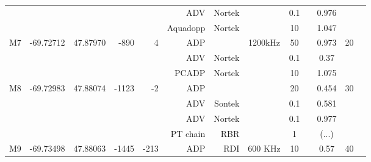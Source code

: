 \documentclass[letterpaper,10pt,landscape]{article}
\begin{document}
\begin{table}
\begin{tabular}{|r|c|c|r|r|r|r|c|c|c|c|c|c|}
    ~                   &                            &                           &                        &                       & ADV          & Nortek   &          & 0.1       &          & 0.976      &                     \\ %
    ~                   &                            &                           &                        &                       & Aquadopp     & Nortek   &          & 10        &          & 1.047      &                     \\\hline
    \multirow{3}{*}{M7} & \multirow{3}{*}{-69.72712} & \multirow{3}{*}{47.87970} & \multirow{3}{*}{-890}  & \multirow{3}{*}{4}    & ADP          &          & 1200kHz  & 50        &          & 0.973      & \multirow{3}{*}{20} \\ 
    ~                   &                            &                           &                        &                       & ADV          & Nortek   &          & 0.1       &          & 0.37       &                     \\ %
    ~                   &                            &                           &                        &                       & PCADP        & Nortek   &          & 10        &          & 1.075      &                     \\\hline
    \multirow{4}{*}{M8} & \multirow{4}{*}{-69.72983} & \multirow{4}{*}{47.88074} & \multirow{4}{*}{-1123} & \multirow{4}{*}{-2}   & ADP          &          &          & 20        &          & 0.454      & \multirow{4}{*}{30} \\ 
    ~                   &                            &                           &                        &                       & ADV          & Sontek   &          & 0.1       &          & 0.581      &                     \\ 
    ~                   &                            &                           &                        &                       & ADV          & Nortek   &          & 0.1       &          & 0.977      &                     \\ %
                        &                            &                           &                        &                       & PT chain     & RBR      &          & 1         &          & (...)      &                     \\\hline
    M9                  & -69.73498                  & 47.88063                  & -1445                  & -213                  & ADP          & RDI      & 600 KHz  & 10        &          & 0.57       & 40                  \\\hline

\end{tabular}
\end{table}
\end{document}
